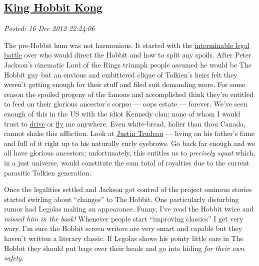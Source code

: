 %

\subsection*{\href{https://bakerjd99.wordpress.com/2012/12/16/king-hobbit-kong/}{King Hobbit Kong}}


\noindent\emph{Posted: 16 Dec 2012 22:24:06}
\vspace{6pt}

The pre-Hobbit hum was not harmonious. It started with the
\href{http://www.nydailynews.com/blogs/pageviews/2012/11/law-of-the-rings-producers-of-the-hobbit-face-epic-legal-battle-alongside-world-pr}{interminable
legal battle} over who would direct the Hobbit and how to split any
spoils. After Peter Jackson's cinematic Lord of the Rings triumph people
assumed he would be The Hobbit guy but an envious and embittered clique
of Tolkien's heirs felt they weren't getting enough for their stuff and
filed suit demanding more. For some reason the spoiled progeny of the
famous and accomplished think they're entitled to feed on their glorious
ancestor's corpse --- oops estate --- forever. We've seen enough of this
in the US with the idiot Kennedy clan: none of whom I would trust to
\href{http://www.washingtonpost.com/wp-srv/politics/special/clinton/frenzy/kennedy.htm}{drive}
or
\href{http://articles.cnn.com/1999-07-21/us/9907\_21\_kennedy.plane.06\_1\_wreckage-piper-saratoga-ii-body?\_s=PM:US}{fly}
me anywhere. Even white-bread, holier than thou Canada, cannot shake
this affliction. Look at
\href{http://www.cbc.ca/news/politics/story/2012/12/03/pol-trudeau-gun-registry-failed-policy.html}{Justin
Trudeau} --- living on his father's fame and full of it right up to his
naturally curly eyebrows. Go back far enough and we all have glorious
ancestors; unfortunately, this entitles us to \emph{precisely squat}
which, in a just universe, would constitute the sum total of royalties
due to the current parasitic Tolkien generation.

Once the legalities settled and Jackson got control of the project
ominous stories started swirling about ``changes'' to The Hobbit. One
particularly disturbing rumor had Legolas making an appearance. Funny,
I've read the Hobbit twice and \emph{missed him in the book!} Whenever
people start ``improving classics'' I get very wary. I'm sure the Hobbit
screen writers are very smart and capable but they haven't written a
literary classic. If Legolas shows his pointy little ears in The Hobbit
they should put bags over their heads and go into hiding \emph{for their
own safety.}

